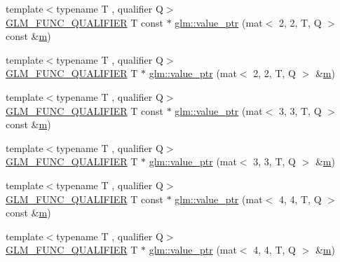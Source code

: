 \begin{DoxyCompactItemize}
\item 
{\footnotesize template$<$typename T , qualifier Q$>$ }\\\hyperlink{setup_8hpp_a33fdea6f91c5f834105f7415e2a64407}{G\+L\+M\+\_\+\+F\+U\+N\+C\+\_\+\+Q\+U\+A\+L\+I\+F\+I\+ER} T const  $\ast$ \hyperlink{group__gtc__type__ptr_ga6144a4839923074f038b63506b855faf}{glm\+::value\+\_\+ptr} (mat$<$ 2, 2, T, Q $>$ const \&\hyperlink{_s_d_l__opengl__glext_8h_af593500c283bf1a787a6f947f503a5c2}{m})
\item 
{\footnotesize template$<$typename T , qualifier Q$>$ }\\\hyperlink{setup_8hpp_a33fdea6f91c5f834105f7415e2a64407}{G\+L\+M\+\_\+\+F\+U\+N\+C\+\_\+\+Q\+U\+A\+L\+I\+F\+I\+ER} T $\ast$ \hyperlink{group__gtc__type__ptr_gac636dcc35b194f5e950a3d0fb9ef44ef}{glm\+::value\+\_\+ptr} (mat$<$ 2, 2, T, Q $>$ \&\hyperlink{_s_d_l__opengl__glext_8h_af593500c283bf1a787a6f947f503a5c2}{m})
\item 
{\footnotesize template$<$typename T , qualifier Q$>$ }\\\hyperlink{setup_8hpp_a33fdea6f91c5f834105f7415e2a64407}{G\+L\+M\+\_\+\+F\+U\+N\+C\+\_\+\+Q\+U\+A\+L\+I\+F\+I\+ER} T const  $\ast$ \hyperlink{group__gtc__type__ptr_gad80f09b66c6f11043ea79e506d141594}{glm\+::value\+\_\+ptr} (mat$<$ 3, 3, T, Q $>$ const \&\hyperlink{_s_d_l__opengl__glext_8h_af593500c283bf1a787a6f947f503a5c2}{m})
\item 
{\footnotesize template$<$typename T , qualifier Q$>$ }\\\hyperlink{setup_8hpp_a33fdea6f91c5f834105f7415e2a64407}{G\+L\+M\+\_\+\+F\+U\+N\+C\+\_\+\+Q\+U\+A\+L\+I\+F\+I\+ER} T $\ast$ \hyperlink{group__gtc__type__ptr_ga7bafdd942876d208a5fc34faa4518c36}{glm\+::value\+\_\+ptr} (mat$<$ 3, 3, T, Q $>$ \&\hyperlink{_s_d_l__opengl__glext_8h_af593500c283bf1a787a6f947f503a5c2}{m})
\item 
{\footnotesize template$<$typename T , qualifier Q$>$ }\\\hyperlink{setup_8hpp_a33fdea6f91c5f834105f7415e2a64407}{G\+L\+M\+\_\+\+F\+U\+N\+C\+\_\+\+Q\+U\+A\+L\+I\+F\+I\+ER} T const  $\ast$ \hyperlink{group__gtc__type__ptr_ga72565b63af29f056843ecd4956b3c738}{glm\+::value\+\_\+ptr} (mat$<$ 4, 4, T, Q $>$ const \&\hyperlink{_s_d_l__opengl__glext_8h_af593500c283bf1a787a6f947f503a5c2}{m})
\item 
{\footnotesize template$<$typename T , qualifier Q$>$ }\\\hyperlink{setup_8hpp_a33fdea6f91c5f834105f7415e2a64407}{G\+L\+M\+\_\+\+F\+U\+N\+C\+\_\+\+Q\+U\+A\+L\+I\+F\+I\+ER} T $\ast$ \hyperlink{group__gtc__type__ptr_ga68a08cd646559275950123dfffbdaf55}{glm\+::value\+\_\+ptr} (mat$<$ 4, 4, T, Q $>$ \&\hyperlink{_s_d_l__opengl__glext_8h_af593500c283bf1a787a6f947f503a5c2}{m})

\end{DoxyCompactItemize}
